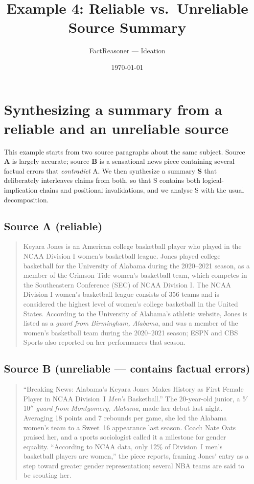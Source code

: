 \documentclass[11pt]{article}
\title{Example 4: Reliable vs.\ Unreliable Source Summary}
\author{FactReasoner --- Ideation}
\date{\today}
\begin{document}
\maketitle
\section{Synthesizing a summary from a reliable and an unreliable source}

This example starts from two source paragraphs about the same subject. Source
\textbf{A} is largely accurate; source \textbf{B} is a sensational news piece
containing several factual errors that \emph{contradict} A. We then synthesize a
summary \textbf{S} that deliberately interleaves claims from both, so that S
contains both logical-implication chains and positional invalidations, and we
analyse S with the usual decomposition.

\subsection*{Source A (reliable)}
\begin{quote}\small
Keyara Jones is an American college basketball player who played in the NCAA
Division I women's basketball league. Jones played college basketball for the
University of Alabama during the 2020--2021 season, as a member of the Crimson
Tide women's basketball team, which competes in the Southeastern Conference (SEC)
of NCAA Division I. The NCAA Division I women's basketball league consists of 356
teams and is considered the highest level of women's college basketball in the
United States. According to the University of Alabama's athletic website, Jones
is listed as a \emph{guard from Birmingham, Alabama}, and was a member of the
women's basketball team during the 2020--2021 season; ESPN and CBS Sports also
reported on her performances that season.
\end{quote}

\subsection*{Source B (unreliable --- contains factual errors)}
\begin{quote}\small
``Breaking News: Alabama's Keyara Jones Makes History as First Female Player in
NCAA Division~I \emph{Men's} Basketball.'' The 20-year-old junior, a 5$'$10$''$
\emph{guard from Montgomery, Alabama}, made her debut last night. Averaging 18
points and 7 rebounds per game, she led the Alabama women's team to a Sweet~16
appearance last season. Coach Nate Oats praised her, and a sports sociologist
called it a milestone for gender equality. ``According to NCAA data, only 12\% of
Division~I men's basketball players are women,'' the piece reports, framing
Jones' entry as a step toward greater gender representation; several NBA teams
are said to be scouting her.
\end{quote}
\end{document}
